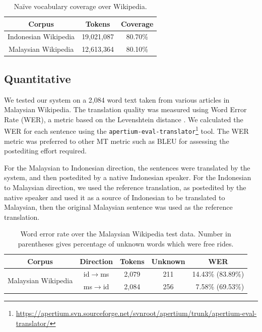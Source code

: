 \documentclass[10pt,a5paper,twoside]{article}
\begin{document}
\begin{table}[htbp]
  \begin{center}
  \begin{tabular}{ccc}
  \toprule
  \bf{Corpus} & \bf{Tokens} & \bf{Coverage}\\
  \midrule
  Indonesian Wikipedia & 19,021,087 & 80.70\% \\
  \midrule
  Malaysian Wikipedia & 12,613,364 & 80.10\% \\
  \bottomrule
  \end{tabular}
  \caption{Na\"ive vocabulary coverage over Wikipedia.}
  \label{table:coverage}
  \end{center}
\end{table}

\subsection{Quantitative}
We tested our system on a 2,084 word text taken from various articles in Malaysian Wikipedia. The translation quality was measured using Word Error Rate (WER), a metric based on the Levenshtein distance \citep{levenshtein/1966}. We calculated the WER for each sentence using the \texttt{\small{apertium-eval-translator}}\footnote{\url{https://apertium.svn.sourceforge.net/svnroot/apertium/trunk/apertium-eval-translator/}} tool. The WER metric was preferred to other MT metric such as BLEU \citep{Papineni2002bleu} for assessing the postediting effort required.

For the Malaysian to Indonesian direction, the sentences were translated by the system, and then postedited by a native Indonesian speaker. For the Indonesian to Malaysian direction, we used the reference translation, as postedited by the native speaker and used it as a source of Indonesian to be translated to Malaysian, then the original Malaysian sentence was used as the reference translation.

\begin{table}[htbp]
  \begin{center}
  \begin{tabular}{ccccr}
  \toprule
  \bf{Corpus}                 & \bf{Direction}         & \bf{Tokens}  & \bf{Unknown} & \multicolumn{1}{c}{\bf{WER}}  \\
  \midrule
  \multirow{2}{*}{Malaysian Wikipedia} & id$\rightarrow$ms & 2,079     & 211  & 14.43\% (83.89\%) \\
                          & ms$\rightarrow$id & 2,084     & 256  & 7.58\% (69.53\%)  \\
  \bottomrule
  \end{tabular}
    \caption{Word error rate over the Malaysian Wikipedia test data. Number in parentheses gives percentage of unknown words which were free rides.}
    \label{table:wer}
  \end{center}
\end{table}
\end{document}
